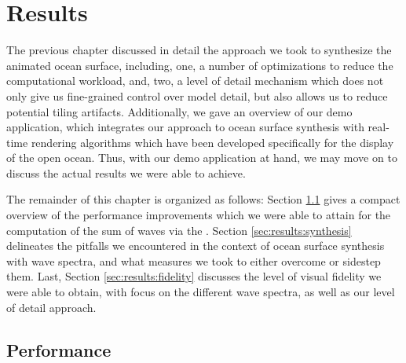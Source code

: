 \chapter{Results}
\label{ch:results}
%

The previous chapter discussed in detail the approach we took to synthesize
the animated ocean surface, including, one, a number of optimizations to reduce
the computational workload, and, two, a level of detail mechanism which does
not only give us fine-grained control over model detail, but also allows us to
reduce potential tiling artifacts. Additionally, we gave an overview of our demo
application, which integrates our approach to ocean surface synthesis
with real-time rendering algorithms which have been developed specifically for
the display of the open ocean.
Thus, with our demo application at hand, we may move on to discuss the
actual results we were able to achieve.

The remainder of this chapter is organized as follows:
Section \ref{sec:results:performance} gives a compact overview of the performance
improvements which we were able to attain for the computation of the sum
of waves via the \InvFourierTransform.
Section \ref{sec:results:synthesis} delineates the pitfalls we encountered
in the context of ocean surface synthesis with wave spectra, and what measures
we took to either overcome or sidestep them.
Last, Section \ref{sec:results:fidelity} discusses the level of visual fidelity
we were able to obtain, with focus on the different wave spectra, as well as
our level of detail approach.


\section{Performance}
\label{sec:results:performance}
%

